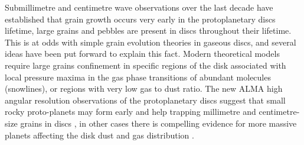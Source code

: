 \documentclass[10pt,fleqn,twoside]{article}
\begin{document}
Submillimetre and centimetre wave observations over the last decade have established that grain growth occurs very early in the protoplanetary discs lifetime, large grains and pebbles are present in discs throughout their lifetime. This is at odds with simple grain evolution theories in gaseous discs, and several ideas have been put forward to explain this fact. Modern theoretical models require large grains confinement in specific regions of the disk associated with local pressure maxima in the gas phase transitions of abundant molecules (snowlines), or regions with very low gas to dust ratio. The new ALMA high angular resolution observations of the protoplanetary discs suggest that small rocky proto-planets may form early and help trapping millimetre and centimetre-size grains in discs \citep[HL~Tau,][]{2015ApJ...808L...3A}, in other cases there is compelling evidence for more massive planets affecting the disk dust and gas distribution \citep{Isella2016,2016Sci...353.1519P}.  
\end{document}
